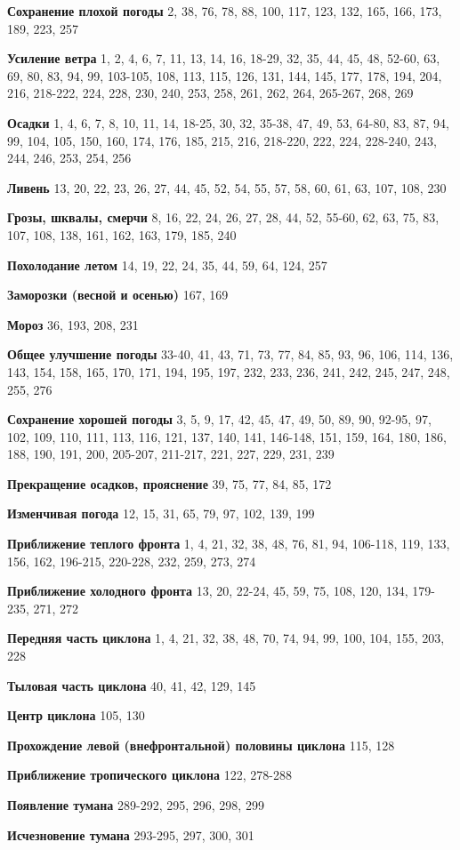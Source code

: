 \textbf{Сохранение плохой погоды} 2, 38, 76, 78, 88, 100, 117, 123,
132, 165, 166, 173, 189, 223, 257

\textbf{Усиление ветра} 1, 2, 4, 6, 7, 11, 13, 14, 16, 18-29, 32, 35,
44, 45, 48, 52-60, 63, 69, 80, 83, 94, 99, 103-105, 108, 113, 115,
126, 131, 144, 145, 177, 178, 194, 204, 216, 218-222, 224, 228, 230,
240, 253, 258, 261, 262, 264, 265-267, 268, 269

\textbf{Осадки} 1, 4, 6, 7, 8, 10, 11, 14, 18-25, 30, 32, 35-38, 47,
49, 53, 64-80, 83, 87, 94, 99, 104, 105, 150, 160, 174, 176, 185, 215,
216, 218-220, 222, 224, 228-240, 243, 244, 246, 253, 254, 256

\textbf{Ливень} 13, 20, 22, 23, 26, 27, 44, 45, 52, 54, 55, 57, 58,
60, 61, 63, 107, 108, 230

\textbf{Грозы, шквалы, смерчи} 8, 16, 22, 24, 26, 27, 28, 44, 52,
55-60, 62, 63, 75, 83, 107, 108, 138, 161, 162, 163, 179, 185, 240

\textbf{Похолодание летом} 14, 19, 22, 24, 35, 44, 59, 64, 124, 257

\textbf{Заморозки (весной и осенью)} 167, 169

\textbf{Мороз} 36, 193, 208, 231

\textbf{Общее улучшение погоды} 33-40, 41, 43, 71, 73, 77, 84, 85, 93,
96, 106, 114, 136, 143, 154, 158, 165, 170, 171, 194, 195, 197, 232,
233, 236, 241, 242, 245, 247, 248, 255, 276

\textbf{Сохранение хорошей погоды} 3, 5, 9, 17, 42, 45, 47, 49, 50,
89, 90, 92-95, 97, 102, 109, 110, 111, 113, 116, 121, 137, 140, 141,
146-148, 151, 159, 164, 180, 186, 188, 190, 191, 200, 205-207,
211-217, 221, 227, 229, 231, 239

\textbf{Прекращение осадков, прояснение} 39, 75, 77, 84, 85, 172

\textbf{Изменчивая погода} 12, 15, 31, 65, 79, 97, 102, 139, 199

\textbf{Приближение теплого фронта} 1, 4, 21, 32, 38, 48, 76, 81, 94,
106-118, 119, 133, 156, 162, 196-215, 220-228, 232, 259, 273, 274

\textbf{Приближение холодного фронта} 13, 20, 22-24, 45, 59, 75, 108,
120, 134, 179-235, 271, 272

\textbf{Передняя часть циклона} 1, 4, 21, 32, 38, 48, 70, 74, 94, 99,
100, 104, 155, 203, 228

\textbf{Тыловая часть циклона} 40, 41, 42, 129, 145

\textbf{Центр циклона} 105, 130

\textbf{Прохождение левой (внефронтальной) половины циклона} 115, 128

\textbf{Приближение тропического циклона} 122, 278-288

\textbf{Появление тумана} 289-292, 295, 296, 298, 299

\textbf{Исчезновение тумана} 293-295, 297, 300, 301

